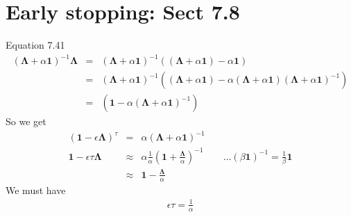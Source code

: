 \documentclass{article}
\newcommand{\ber}{\begin{eqnarray}}
\newcommand{\eer}{\end{eqnarray}}
\begin{document}
\section{Early stopping: Sect 7.8}
Equation 7.41
\ber
(\pmb{\Lambda}+\alpha\pmb{1})^{-1}\pmb{\Lambda} &=& (\pmb{\Lambda}+\alpha\pmb{1})^{-1}((\pmb{\Lambda}+\alpha\pmb{1})-\alpha\pmb{1})\\
&=&  (\pmb{\Lambda}+\alpha\pmb{1})^{-1}((\pmb{\Lambda}+\alpha\pmb{1})-\alpha(\pmb{\Lambda}+\alpha\pmb{1})(\pmb{\Lambda}+\alpha\pmb{1})^{-1})\\
&=& (\pmb{1}-\alpha(\pmb{\Lambda}+\alpha\pmb{1})^{-1})
\eer
So we get
\ber
(\pmb{1}-\epsilon\pmb{\Lambda})^{\tau} &=&\alpha(\pmb{\Lambda}+\alpha\pmb{1})^{-1}\\
\pmb{1}-\epsilon\tau\pmb{\Lambda} &\approx& \alpha\frac{1}{\alpha}(\pmb{1}+\frac{\pmb{\Lambda}}{\alpha})^{-1} \qquad \ldots (\beta\pmb{1})^{-1} = \frac{1}{\beta}\pmb{1}\\
&\approx& \pmb{1} - \frac{\pmb{\Lambda}}{\alpha}
\eer
We must have
\ber
\epsilon\tau=\frac{1}{\alpha}
\eer
%
%
%
\end{document}
